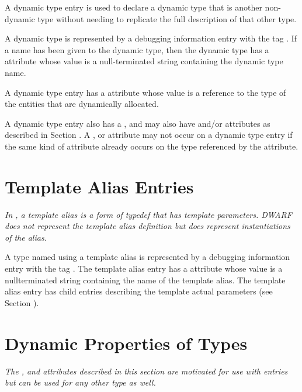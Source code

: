 A dynamic type entry is used to declare a dynamic type that is
 another non-dynamic type without needing to
replicate the full description of that other type.

A dynamic type is represented by a debugging information entry
with the tag \DWTAGdynamictypeTARG. If a name has been given to the
dynamic type, then the dynamic type has a \DWATname{} attribute
whose value is a null-terminated string containing the dynamic
type name.

A dynamic type entry has a \DWATtype{} attribute whose value is a
reference to the type of the entities that are dynamically allocated.

A dynamic type entry also has a \DWATdatalocation, and may also
have \DWATallocated{} and/or \DWATassociated{} attributes as
described in Section .
A \DWATdatalocation, \DWATallocated{} or \DWATassociated{} attribute
may not occur on a dynamic type entry if the same kind of attribute
already occurs on the type referenced by the \DWATtype{} attribute.


\section{Template Alias Entries}
\label{chap:templatealiasentries}

\textit{In , a template alias is a form of typedef that has template
parameters.  DWARF does not represent the template alias definition
but does represent instantiations of the alias.}

A type named using a template alias is represented
by a debugging information entry
with the tag
\DWTAGtemplatealiasTARG.
The template alias entry has a
\DWATname{} attribute
whose value is a null\dash terminated string
containing the name of the template alias.
The template alias entry has child entries describing the template
actual parameters (see Section ).


\section{Dynamic Properties of Types}
\label{chap:dynamicpropertiesoftypes}
\textit{The \DWATdatalocation, \DWATallocated{} and \DWATassociated{}
attributes described in this section are motivated for use with
\DWTAGdynamictype{} entries but can be used for any other type as well.}

